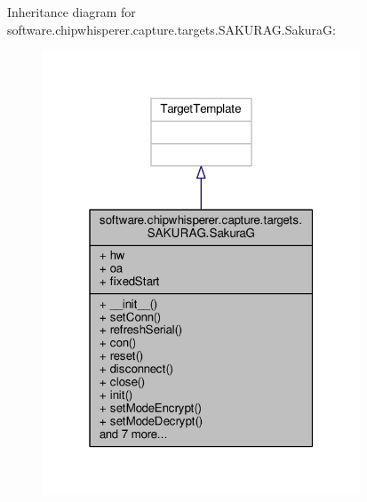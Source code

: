 Inheritance diagram for software.\+chipwhisperer.\+capture.\+targets.\+S\+A\+K\+U\+R\+A\+G.\+Sakura\+G\+:\nopagebreak
\begin{figure}[H]
\begin{center}
\leavevmode
\includegraphics[width=268pt]{dd/dfb/classsoftware_1_1chipwhisperer_1_1capture_1_1targets_1_1SAKURAG_1_1SakuraG__inherit__graph}
\end{center}
\end{figure}



